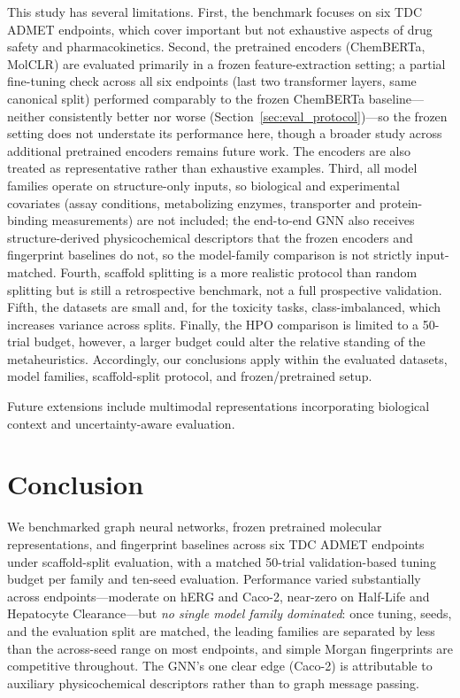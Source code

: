 \documentclass[journal]{IEEEtran}
\begin{document}
This study has several limitations. First, the benchmark focuses on six TDC ADMET endpoints, which cover important but not exhaustive aspects of drug safety and pharmacokinetics. Second, the pretrained encoders (ChemBERTa, MolCLR) are evaluated primarily in a frozen feature-extraction setting; a partial fine-tuning check across all six endpoints (last two transformer layers, same canonical split) performed comparably to the frozen ChemBERTa baseline---neither consistently better nor worse (Section~\ref{sec:eval_protocol})---so the frozen setting does not understate its performance here, though a broader study across additional pretrained encoders remains future work. The encoders are also treated as representative rather than exhaustive examples. Third, all model families operate on structure-only inputs, so biological and experimental covariates (assay conditions, metabolizing enzymes, transporter and protein-binding measurements) are not included; the end-to-end GNN also receives structure-derived physicochemical descriptors that the frozen encoders and fingerprint baselines do not, so the model-family comparison is not strictly input-matched. Fourth, scaffold splitting is a more realistic protocol than random splitting but is still a retrospective benchmark, not a full prospective validation. Fifth, the datasets are small and, for the toxicity tasks, class-imbalanced, which increases variance across splits. Finally, the HPO comparison is limited to a 50-trial budget, however, a larger budget could alter the relative standing of the metaheuristics. Accordingly, our conclusions apply within the evaluated datasets, model families, scaffold-split protocol, and frozen/pretrained setup.

Future extensions include multimodal representations incorporating biological context and uncertainty-aware evaluation.


\section{Conclusion}
\label{sec:conclusion}

We benchmarked graph neural networks, frozen pretrained molecular representations, and fingerprint baselines across six TDC ADMET endpoints under scaffold-split evaluation, with a matched 50-trial validation-based tuning budget per family and ten-seed evaluation. Performance varied substantially across endpoints---moderate on hERG and Caco-2, near-zero on Half-Life and Hepatocyte Clearance---but \emph{no single model family dominated}: once tuning, seeds, and the evaluation split are matched, the leading families are separated by less than the across-seed range on most endpoints, and simple Morgan fingerprints are competitive throughout. The GNN's one clear edge (Caco-2) is attributable to auxiliary physicochemical descriptors rather than to graph message passing.
\end{document}
